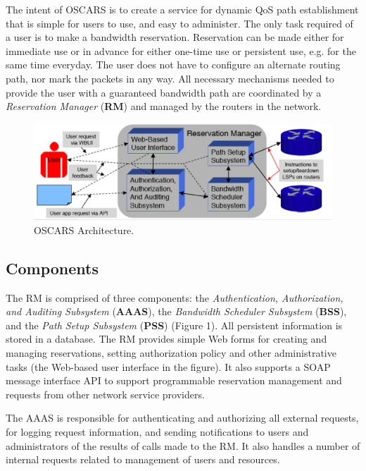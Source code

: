 \documentclass[conference]{IEEEtran}
\begin{document}
The intent of OSCARS is to create a service for dynamic QoS path establishment
that is simple for users to use, and easy to administer.  The only task 
required of a user is to make a bandwidth reservation.  Reservation can be made 
either for immediate use or in advance for either one-time use or persistent use, 
e.g. for the same time everyday. The user does not have 
to configure an alternate routing path, nor mark the packets in any way.  All 
necessary mechanisms needed to provide the user with a guaranteed bandwidth 
path are coordinated by a  \emph{Reservation Manager} (\textbf{RM}) and 
managed by the routers in the network.

\begin{figure}
 \centering 
   \includegraphics[scale=0.3]{pict1.eps}
   \caption{OSCARS Architecture.}
 \label{fig:oscars_arch}
\end{figure}

\subsection{Components}

The RM is comprised of three components:  the 
 \emph{Authentication, Authorization, and Auditing Subsystem} (\textbf{AAAS}), 
the  \emph{Bandwidth Scheduler Subsystem} (\textbf{BSS}), and the  \emph{Path 
Setup Subsystem} (\textbf{PSS}) (Figure 1). All persistent information is 
stored in a database.  
The RM provides simple Web forms for creating and managing reservations, 
setting authorization policy and other administrative tasks (the Web-based
user interface in the figure).
It also supports a SOAP message interface API to support programmable 
reservation management and requests from other network service providers.

The AAAS is responsible for authenticating and authorizing all external 
requests, for logging request information, and sending notifications to
users and administrators of the results of calls made to the RM.  It also
handles a number of internal requests related to management of users 
and resources.
\end{document}
